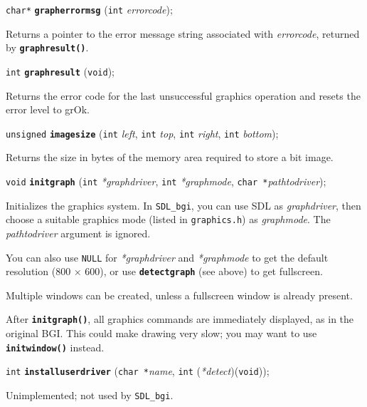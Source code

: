 \documentclass[a4paper,11pt]{article}
\newcommand{\SDLbgi}{\texttt{SDL\_bgi}}
\newcommand{\V}{\texttt{void}}      %
\newcommand{\I}{\texttt{int}}       %
\newcommand{\C}{\texttt{char *}}    %
\newcommand{\func}[1]{\textbf{\texttt{#1}}}  %
\newcommand{\A}[1]{\emph{#1}}       %
\newcommand{\F}[1]{\texttt{#1}}     %
\newcommand{\T}[1]{\texttt{#1}}     %
\newenvironment{bgi}
{ %
  \begin{snugshade}
}
{ %
  \end{snugshade}
}
\begin{document}

\begin{bgi}
\texttt{char*} \func{grapherrormsg} (\I{} \A{errorcode});
\end{bgi}

Returns a pointer to the error message string associated with
\A{errorcode}, returned by \func{graphresult()}.


\begin{bgi}
\I{} \func{graphresult} (\V{});
\end{bgi}

Returns the error code for the last unsuccessful graphics operation
and resets the error level to grOk.


\begin{bgi}
\texttt{unsigned} \func{imagesize} (\I{} \A{left}, \I{} \A{top}, \I{}
\A{right}, \I{} \A{bottom});
\end{bgi}

Returns the size in bytes of the memory area required to store a bit
image.


\begin{bgi}
\V{} \func{initgraph} (\I{} \A{*graphdriver}, \I{} \A{*graphmode},
\C{}\A{pathtodriver});
\end{bgi}

Initializes the graphics system. In \SDLbgi, you can use SDL as
\A{graphdriver}, then choose a suitable graphics mode (listed in
\F{graphics.h}) as \A{graphmode}. The \A{pathtodriver} argument is
ignored.

You can also use \T{NULL} for \A{*graphdriver} and \A{*graphmode} to
get the default resolution (800 $\times$ 600), or use
\func{detectgraph} (see above) to get fullscreen.

Multiple windows can be created, unless a fullscreen window is already
present.

After \func{initgraph()}, all graphics commands are immediately
displayed, as in the original BGI. This could make drawing very slow;
you may want to use \func{initwindow()} instead.


\begin{bgi}
\I{} \func{installuserdriver} (\C{}\A{name}, \I{} (\A{*detect})(\V{})); 
\end{bgi}

Unimplemented; not used by \SDLbgi.
\end{document}

